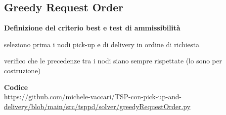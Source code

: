 \documentclass[9pt]{beamer}
\begin{document}
\subsection{Greedy Request Order}
\begin{frame}[allowframebreaks]{\subsecname}
	\textbf{Definizione del criterio best e test di ammissibilità}
      \begin{description}[style=unboxed,leftmargin=0cm]
        \item[criterio best] seleziono prima i nodi pick-up e di delivery in ordine di richiesta
	  \item[test di ammissibilità] verifico che le precedenze tra i nodi siano sempre rispettate (lo sono per costruzione)
      \end{description}

	\textbf{Codice} \\
		\href{https://github.com/michele-vaccari/TSP-con-pick-up-and-delivery/blob/main/src/tsppd/solver/greedyRequestOrder.py}{https://github.com/michele-vaccari/TSP-con-pick-up-and-delivery/blob/main/src/tsppd/solver/greedyRequestOrder.py}

\framebreak


\end{frame}
\end{document}
